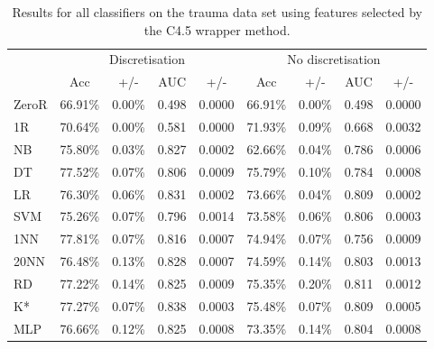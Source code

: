 \begin{table}[htbp]
\caption{Results for all classifiers on the trauma data set using features selected by the C4.5 wrapper method.}
\begin{tabular}{|l|cccc|cccc|}
\hline
 & \multicolumn{ 4}{c|}{Discretisation} & \multicolumn{ 4}{c|}{No discretisation} \\ 
  & Acc & +/- & AUC & +/- & Acc & +/- & AUC & +/- \\ \hline
ZeroR & 66.91\% & 0.00\% & 0.498 & 0.0000 & 66.91\% & 0.00\% & 0.498 & 0.0000 \\ 
1R & 70.64\% & 0.00\% & 0.581 & 0.0000 & 71.93\% & 0.09\% & 0.668 & 0.0032 \\ 
NB & 75.80\% & 0.03\% & 0.827 & 0.0002 & 62.66\% & 0.04\% & 0.786 & 0.0006 \\ 
DT & 77.52\% & 0.07\% & 0.806 & 0.0009 & 75.79\% & 0.10\% & 0.784 & 0.0008 \\ 
LR & 76.30\% & 0.06\% & 0.831 & 0.0002 & 73.66\% & 0.04\% & 0.809 & 0.0002 \\ 
SVM & 75.26\% & 0.07\% & 0.796 & 0.0014 & 73.58\% & 0.06\% & 0.806 & 0.0003 \\ 
1NN & 77.81\% & 0.07\% & 0.816 & 0.0007 & 74.94\% & 0.07\% & 0.756 & 0.0009 \\ 
20NN & 76.48\% & 0.13\% & 0.828 & 0.0007 & 74.59\% & 0.14\% & 0.803 & 0.0013 \\ 
RD & 77.22\% & 0.14\% & 0.825 & 0.0009 & 75.35\% & 0.20\% & 0.811 & 0.0012 \\ 
K* & 77.27\% & 0.07\% & 0.838 & 0.0003 & 75.48\% & 0.07\% & 0.809 & 0.0005 \\ 
MLP & 76.66\% & 0.12\% & 0.825 & 0.0008 & 73.35\% & 0.14\% & 0.804 & 0.0008 \\ \hline
\end{tabular}
\label{}
\end{table}
